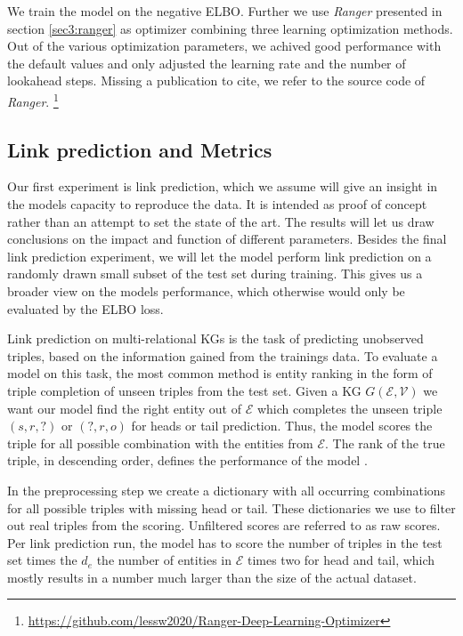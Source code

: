 We train the model on the negative ELBO. Further we use \textit{Ranger} presented in section \ref{sec3:ranger} as optimizer combining three learning optimization methods. Out of the various optimization parameters, we achived good performance with the default values and  only adjusted the learning rate and the number of lookahead steps. Missing a publication to cite, we refer to the source code of \textit{Ranger}. \footnote{\url{https://github.com/lessw2020/Ranger-Deep-Learning-Optimizer}}



\subsection{Link prediction and Metrics}
\label{ssec4:lpmetrics}
Our first experiment is link prediction, which we assume will give an insight in the models capacity to reproduce the data. It is intended as proof of concept rather than an attempt to set the state of the art. The results will let us draw conclusions on the impact and function of different parameters.
Besides the final link prediction experiment, we will let the model perform link prediction on a randomly drawn small subset of the test set during training. This gives us a broader view on the models performance, which otherwise would only be evaluated by the ELBO loss.  

Link prediction on multi-relational KGs is the task of predicting unobserved triples, based on the information gained from the trainings data. To evaluate a model on this task, the most common method is entity ranking in the form of triple completion of unseen triples from the test set. Given a KG $G(\mathcal{E},\mathcal{V})$ we want our model find the right entity out of $\mathcal{E}$ which completes the unseen triple $(s,r,?)$ or $(?,r,o)$ for heads or tail prediction. Thus, the model scores the triple for all possible combination with the entities from $\mathcal{E}$. The rank of the true triple, in descending order, defines the performance of the model \cite{ruffinelli_you_2019}.

In the preprocessing step we create a dictionary with all occurring combinations for all possible triples with missing head or tail. These dictionaries we use to filter out real triples from the scoring. Unfiltered scores are referred to as raw scores. Per link prediction run, the model has to score the number of triples in the test set times the $d_e$ the number of entities in $\mathcal{E}$ times two for head and tail, which mostly results in a number much larger than the size of the actual dataset.


